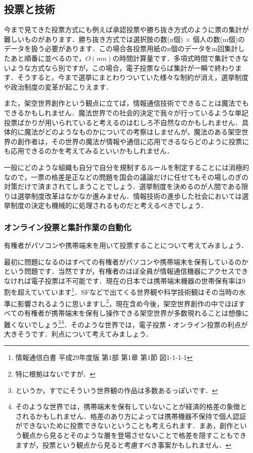 \subsection{投票と技術}
今まで見てきた投票方式にも例えば承認投票や勝ち抜き方式のように票の集計が難しいものがあります．勝ち抜き方式では選択肢の数(n個) $\times$ 個人の数(m個)のデータを扱う必要があります．この場合各投票用紙のn個のデータをm回集計したあと順番に並べるので，$O(mn)$の時間計算量です．多項式時間で集計できないような方式なら別ですが，この場合，電子投票ならば集計が一瞬で終わります．そうすると，今まで選挙にまとわりついていた様々な制約が消え，選挙制度や政治制度の変革が起こりえます．

また，架空世界創作という観点に立てば，情報通信技術でできることは魔法でもできるかもしれません．魔法世界での社会的決定で我々が行っているような単記投票ばかりが用いられていると考えるのはむしろ不自然なのかもしれません．具体的に魔法がどのようなものかについての考察はしませんが，魔法のある架空世界の創作者は，その世界の魔法が情報や通信に応用できるならどのように投票にも応用できるのかを考えてみるといいかもしれません．

一般にどのような組織も自分で自分を規制するルールを制定することには消極的なので，一票の格差是正などの問題を国会の議論だけに任せてもその場しのぎの対策だけで済まされてしまうことでしょう．選挙制度を決めるのが人間である限りは選挙制度改革はなかなか進みません．情報技術の進歩した社会においては選挙制度の決定も機械的に処理されるものだと考えるべきでしょう．

\subsubsection*{オンライン投票と集計作業の自動化}
有権者がパソコンや携帯端末を用いて投票することについて考えてみましょう．

最初に問題になるのはすべての有権者がパソコンや携帯端末を保有しているのかという問題です．当然ですが，有権者のほぼ全員が情報通信機器にアクセスできなければ電子投票は不可能です．現在の日本では携帯端末機器の世帯保有率は9割を超えていています\footnote{情報通信白書 平成29年度版 第1部 第1章 第1節 図1-1-1-1}．SFなどで出てくる世界観や科学技術観はその当時の水準に影響されるように思いますし\footnote{特に根拠はないですが．}，現在含め今後，架空世界創作の中でほぼすべての有権者が携帯端末を保有し操作できる架空世界が多数現れることは想像に難くないでしょう\footnote{というか，すでにそういう世界観の作品は多数あるっぽいです．}\footnote{そのような世界では，携帯端末を保有していないことが経済的格差の象徴とされるかもしれません．格差のあり方によっては携帯機器不保持で個人認証ができないために投票できないということも考えられます．まあ，創作という観点から見るとそのような層を登場させないことで格差を隠すこともできますが，投票という観点から見ると考慮すべき事案かもしれません．}．そのような世界では，電子投票・オンライン投票の利点が大きそうです．利点について考えてみましょう．


